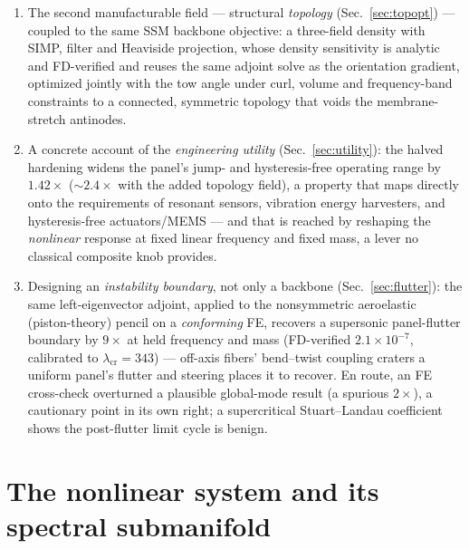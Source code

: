 \documentclass[11pt]{article}
\begin{document}
\begin{enumerate}
up/down frequency sweeps that trace the SSM-predicted damped forced response.
\item The second manufacturable field --- structural \emph{topology}
(Sec.~\ref{sec:topopt}) --- coupled to the same SSM backbone objective: a
three-field density with SIMP, filter and Heaviside projection, whose density
sensitivity is analytic and FD-verified and reuses the same adjoint solve as the
orientation gradient, optimized jointly with the tow angle under curl, volume and
frequency-band constraints to a connected, symmetric topology that voids the
membrane-stretch antinodes.
\item A concrete account of the \emph{engineering utility}
(Sec.~\ref{sec:utility}): the halved hardening widens the panel's jump- and
hysteresis-free operating range by $1.42\times$ ($\sim\!2.4\times$ with the added
topology field), a property that maps directly onto the requirements of resonant
sensors, vibration energy harvesters, and hysteresis-free actuators/MEMS --- and
that is reached by reshaping the \emph{nonlinear} response at fixed linear frequency
and fixed mass, a lever no classical composite knob provides.
\item Designing an \emph{instability boundary}, not only a backbone
(Sec.~\ref{sec:flutter}): the same left-eigenvector adjoint, applied to the nonsymmetric
aeroelastic (piston-theory) pencil on a \emph{conforming} FE, recovers a supersonic
panel-flutter boundary by $9\times$ at held frequency and mass (FD-verified $2.1\times10^{-7}$,
calibrated to $\lambda_{\mathrm{cr}}=343$) --- off-axis fibers' bend--twist coupling craters a
uniform panel's flutter and steering places it to recover. En route, an FE cross-check
overturned a plausible global-mode result (a spurious $2\times$), a cautionary point in its own
right; a supercritical Stuart--Landau coefficient shows the post-flutter limit cycle is benign.
\end{enumerate}

\section{The nonlinear system and its spectral submanifold}\label{sec:ssm}
\end{document}
